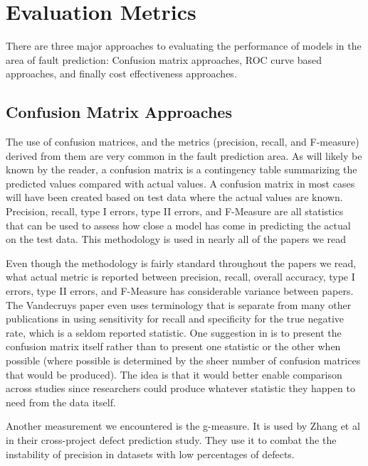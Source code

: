 \documentclass{sig-alternate-05-2015}
\begin{document}
\section{Evaluation Metrics}

There are three major approaches to evaluating the performance of models in the area of fault prediction:  Confusion matrix approaches, ROC curve based approaches, and finally cost effectiveness approaches.

\subsection{Confusion Matrix Approaches}

The use of confusion matrices, and the metrics (precision, recall, and F-measure) derived from them are very common in the fault prediction area.  As will likely be known by the reader, a confusion matrix is a contingency table summarizing the predicted values compared with actual values.  A confusion matrix in most cases will have been created based on test data where the actual values are known.  Precision, recall, type I errors, type II errors, and F-Measure are all statistics that can be used to assess how close a model has come in predicting the actual on the test data.  This methodology is used in nearly all of the papers we read \cite{Posnett} \cite{Nam} \cite{Bird} \cite{Vandecruys} \cite{Nagappan} \cite{Arisholm} \cite{Rahman} \cite{Jiang} \cite{Zhang2014} 

Even though the methodology is fairly standard throughout the papers we read, what actual metric is reported between precision, recall, overall accuracy, type I errors, type II errors, and F-Measure has considerable variance between papers.  The Vandecruys paper \cite{Vandecruys} even uses terminology that is separate from many other publications in using sensitivity for recall and specificity for the true negative rate, which is a seldom reported statistic. One suggestion in \cite{Hall} is to present the confusion matrix itself rather than to present one statistic or the other when possible (where possible is determined by the sheer number of confusion matrices that would be produced).  The idea is that it would better enable comparison across studies since researchers could produce whatever statistic they happen to need from the data itself.

Another measurement we encountered is the g-measure. It is used by Zhang et al \cite{Zhang2014} in their cross-project defect prediction study. They use it to combat the the instability of precision in datasets with low percentages of defects.  
\end{document}
